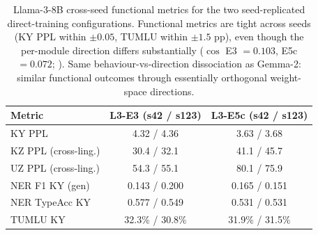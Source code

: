 \documentclass[11pt]{article}
\begin{document}
\begin{table}[!htbp]
\caption{Per-module pairwise cosine on Llama-3-8B (L3) vs.\ Gemma-2-9B (G2). (i) The collapse-vs-healthy comparison $\cos$(E5, E5c) sits in the same regime on both architectures ($\leq 0.03$, $0$ modules above $0.5$). (ii) Cross-seed direct-training cosines on L3 ($0.07$--$0.10$) are $\sim 2\times$ G2's ($0.03$--$0.04$); same scaling for the C5 probe ($0.343$ vs.\ $0.155$). \textbf{(iii) Transfer pins to source, not to a canonical direction.} The adapter is pinned to its own KZ source on both architectures ($\cos\approx 0.80$). The Gemma cross-seed value of $0.785$ was measured with two stage-2 warm-starts from a \emph{shared} E1-s42 source; the architecturally-fair test -- two transfers from \emph{independent} KZ baselines -- gives $0.060$ on L3 and $0.023$ on Gemma, inside the direct-training band. Functional retention reproduces under independent reseeding on both architectures; directional convergence does not. The underdetermination inequality of  thus extends to transfer once the source is reseeded.}
\label{tab:llama3_cos}

\vspace{1em}

\centering
\small
\setlength{\tabcolsep}{6pt}
\begin{tabular}{lcc}
\toprule
\textbf{Metric} & \textbf{L3-E3 (s42 / s123)} & \textbf{L3-E5c (s42 / s123)} \\
\midrule
KY PPL                      & 4.32 / 4.36       & 3.63 / 3.68 \\
KZ PPL (cross-ling.)        & 30.4 / 32.1       & 41.1 / 45.7 \\
UZ PPL (cross-ling.)        & 54.3 / 55.1       & 80.1 / 75.9 \\
NER F1 KY (gen)             & 0.143 / 0.200     & 0.165 / 0.151 \\
NER TypeAcc KY              & 0.577 / 0.549     & 0.531 / 0.531 \\
TUMLU KY                    & 32.3\% / 30.8\%   & 31.9\% / 31.5\% \\
\bottomrule
\end{tabular}
\caption{Llama-3-8B cross-seed functional metrics for the two seed-replicated direct-training configurations. Functional metrics are tight across seeds (KY PPL within $\pm 0.05$, TUMLU within $\pm 1.5$ pp), even though the per-module direction differs substantially ($\cos$ E3 $=0.103$, E5c $=0.072$; ). Same behaviour-vs-direction dissociation as Gemma-2: similar functional outcomes through essentially orthogonal weight-space directions.}
\label{tab:llama3_seed}
\end{table}
\end{document}
